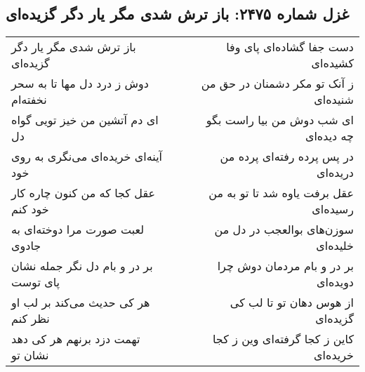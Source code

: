 \begin{center}
\section*{غزل شماره ۲۴۷۵: باز ترش شدی مگر یار دگر گزیده‌ای}
\label{sec:2475}
\begin{longtable}{l p{0.5cm} r}
باز ترش شدی مگر یار دگر گزیده‌ای
&&
دست جفا گشاده‌ای پای وفا کشیده‌ای
\\
دوش ز درد دل مها تا به سحر نخفته‌ام
&&
ز آنک تو مکر دشمنان در حق من شنیده‌ای
\\
ای دم آتشین من خیز تویی گواه دل
&&
ای شب دوش من بیا راست بگو چه دیده‌ای
\\
آینه‌ای خریده‌ای می‌نگری به روی خود
&&
در پس پرده رفته‌ای پرده من دریده‌ای
\\
عقل کجا که من کنون چاره کار خود کنم
&&
عقل برفت یاوه شد تا تو به من رسیده‌ای
\\
لعبت صورت مرا دوخته‌ای به جادوی
&&
سوزن‌های بوالعجب در دل من خلیده‌ای
\\
بر در و بام دل نگر جمله نشان پای توست
&&
بر در و بام مردمان دوش چرا دویده‌ای
\\
هر کی حدیث می‌کند بر لب او نظر کنم
&&
از هوس دهان تو تا لب کی گزیده‌ای
\\
تهمت دزد برنهم هر کی دهد نشان تو
&&
کاین ز کجا گرفته‌ای وین ز کجا خریده‌ای
\\
\end{longtable}
\end{center}
